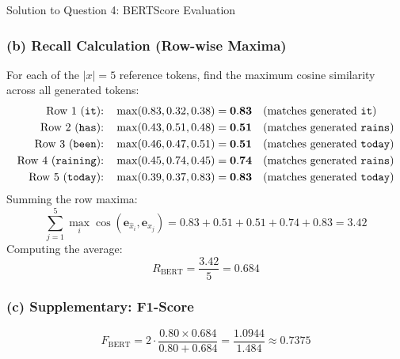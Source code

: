 \documentclass[11pt,a4paper]{article}
\begin{document}
\begin{solutionbox}{Solution to Question 4: BERTScore Evaluation}
\subsubsection*{(b) Recall Calculation (Row-wise Maxima)}
For each of the $|x| = 5$ reference tokens, find the maximum cosine similarity across all generated tokens:
\begin{align}
    \text{Row 1 (\texttt{it}):} \quad & \max(0.83, 0.32, 0.38) = \mathbf{0.83} \quad (\text{matches generated \texttt{it}}) \\
    \text{Row 2 (\texttt{has}):} \quad & \max(0.43, 0.51, 0.48) = \mathbf{0.51} \quad (\text{matches generated \texttt{rains}}) \\
    \text{Row 3 (\texttt{been}):} \quad & \max(0.46, 0.47, 0.51) = \mathbf{0.51} \quad (\text{matches generated \texttt{today}}) \\
    \text{Row 4 (\texttt{raining}):} \quad & \max(0.45, 0.74, 0.45) = \mathbf{0.74} \quad (\text{matches generated \texttt{rains}}) \\
    \text{Row 5 (\texttt{today}):} \quad & \max(0.39, 0.37, 0.83) = \mathbf{0.83} \quad (\text{matches generated \texttt{today}})
\end{align}
Summing the row maxima:
\begin{equation}
    \sum_{j=1}^{5} \max_{i} \cos(\mathbf{e}_{\hat{x}_i}, \mathbf{e}_{x_j}) = 0.83 + 0.51 + 0.51 + 0.74 + 0.83 = 3.42
\end{equation}
Computing the average:
\begin{equation}
    R_{\text{BERT}} = \frac{3.42}{5} = \mathbf{0.684}
\end{equation}

\subsubsection*{(c) Supplementary: F1-Score}
\begin{equation}
    F_{\text{BERT}} = 2 \cdot \frac{0.80 \times 0.684}{0.80 + 0.684} = \frac{1.0944}{1.484} \approx \mathbf{0.7375}
\end{equation}


\end{solutionbox}
\end{document}

